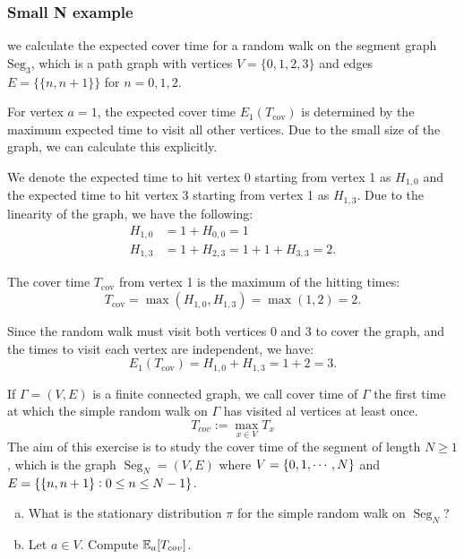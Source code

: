 \begin{solution}
\begin{enumerate}[(a)]
		\subsubsection*{Small N example}
		we calculate the expected cover time for a random walk on the segment graph \( \text{Seg}_3 \), which is a path graph with vertices \( V = \{0, 1, 2, 3\} \) and edges \( E = \{\{n, n+1\}\} \) for \( n = 0, 1, 2 \).
		
		For vertex \( a = 1 \), the expected cover time \( E_1(T_{\text{cov}}) \) is determined by the maximum expected time to visit all other vertices. Due to the small size of the graph, we can calculate this explicitly.
		
		We denote the expected time to hit vertex 0 starting from vertex 1 as \( H_{1,0} \) and the expected time to hit vertex 3 starting from vertex 1 as \( H_{1,3} \). Due to the linearity of the graph, we have the following:
		\begin{align*}
			H_{1,0} &= 1 + H_{0,0} = 1 \\
			H_{1,3} &= 1 + H_{2,3} = 1 + 1 + H_{3,3} = 2.
		\end{align*}
		
		The cover time \( T_{\text{cov}} \) from vertex 1 is the maximum of the hitting times:
		\begin{equation*}
			T_{\text{cov}} = \max(H_{1,0}, H_{1,3}) = \max(1, 2) = 2.
		\end{equation*}
		
		Since the random walk must visit both vertices 0 and 3 to cover the graph, and the times to visit each vertex are independent, we have:
		\begin{equation*}
			E_1(T_{\text{cov}}) = H_{1,0} + H_{1,3} = 1 + 2 = 3.
		\end{equation*}
		
	\end{enumerate}
\end{solution}



\begin{problem}
	If $\Gamma = (V,E)$ is a finite connected graph, we call cover time of $\Gamma$ the first time at which the simple random walk on $\Gamma$ has visited al vertices at least once.
	\[ T_{cov} := \max_{x\in V} T_x \]
	The aim of this exercise is to study the cover time of the segment of length $N\geq 1$, which is the graph $\operatorname{Seg}_N = (V,E)$ where $V = \{0,1,\cdots,N\}$ and $E = \{\{n,n+1\}:0\leq n \leq N-1\}$.
	\begin{enumerate}[(a),itemsep=0pt]
		\item What is the stationary distribution $\pi$ for the simple random walk on $\operatorname{Seg}_N$?
		\item Let $a \in V$. Compute $\mathbb{E}_a[T_{cov}]$.
	\end{enumerate}
\end{problem}

